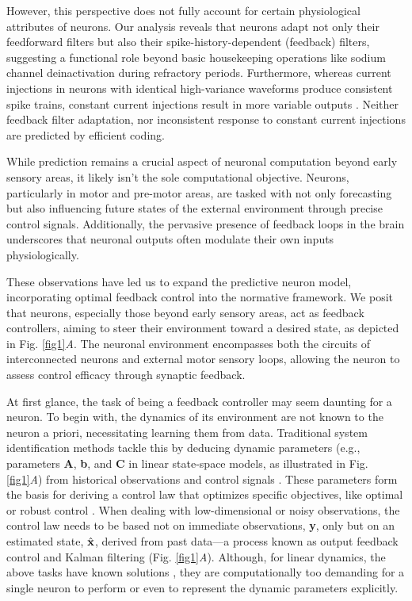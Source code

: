 \documentclass[9pt,twocolumn,twoside]{pnas-new}
\begin{document}
However, this perspective does not fully account for certain physiological attributes of neurons. Our analysis reveals that neurons adapt not only their feedforward filters but also their spike-history-dependent (feedback) filters, suggesting a functional role beyond basic housekeeping operations like sodium channel deinactivation during refractory periods. Furthermore, whereas current injections in neurons with identical high-variance waveforms produce consistent spike trains, constant current injections result in more variable outputs \citep{mainen1995reliability}. Neither feedback filter adaptation, nor inconsistent response to constant current injections are predicted by efficient coding.

While prediction remains a crucial aspect of neuronal computation beyond early sensory areas, it likely isn’t the sole computational objective. Neurons, particularly in motor and pre-motor areas, are tasked with not only forecasting but also influencing future states of the external environment through precise control signals. Additionally, the pervasive presence of feedback loops in the brain \citep{bell1999levels,song2005highly,varshney2011structural,winding2023connectome} underscores that neuronal outputs often modulate their own inputs physiologically. 

These observations have led us to expand the predictive neuron model, incorporating optimal feedback control into the normative framework. We posit that neurons, especially those beyond early sensory areas, act as feedback controllers, aiming to steer their environment toward a desired state, as depicted in Fig. \ref{fig1}{\it A}. The neuronal environment encompasses both the circuits of interconnected neurons and external motor sensory loops, allowing the neuron to assess control efficacy through synaptic feedback.

At first glance, the task of being a feedback controller may seem daunting for a neuron. To begin with, the dynamics of its environment are not known to the neuron a priori, necessitating learning them from data. Traditional system identification methods tackle this by deducing dynamic parameters (e.g., parameters {\bf A}, {\bf b}, and {\bf C} in linear state-space models, as illustrated in Fig. \ref{fig1}{\it A}) from historical observations and control signals \citep{katayama2005subspace}. These parameters form the basis for deriving a control law that optimizes specific objectives, like optimal or robust control \citep{aastrom2021feedback}. When dealing with low-dimensional or noisy observations, the control law needs to be based not on immediate observations, {\bf y}, only but on an estimated state, $ \hat{\bf x} $, \citep{aastrom2021feedback} derived from past data—a process known as output feedback control and Kalman filtering (Fig. \ref{fig1}{\it A}). Although, for linear dynamics, the above tasks have known solutions \citep{katayama2005subspace,aastrom2021feedback}, they are computationally too demanding for a single neuron to perform or even to represent the dynamic parameters explicitly.
\end{document}
